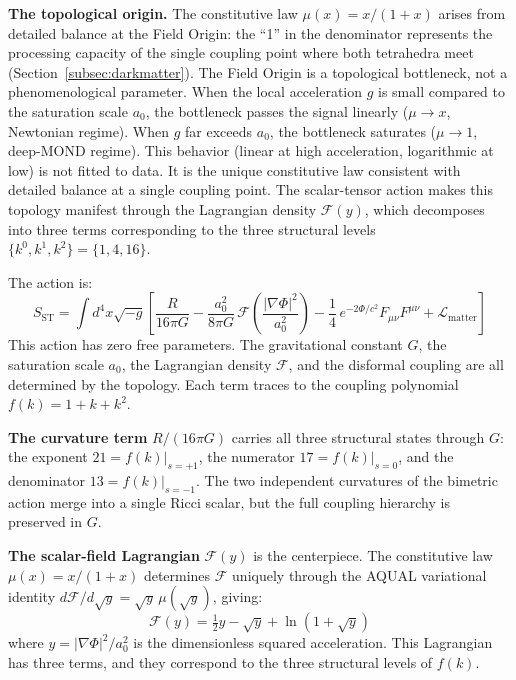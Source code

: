 \documentclass[aps,prd,preprint,superscriptaddress,showpacs,preprintnumbers,amsmath,amssymb,nofootinbib]{revtex4-2}
\begin{document}
\textbf{The topological origin.} The constitutive law $\mu(x) = x/(1+x)$ arises from detailed balance at the Field Origin: the ``1'' in the denominator represents the processing capacity of the single coupling point where both tetrahedra meet (Section~\ref{subsec:darkmatter}). The Field Origin is a topological bottleneck, not a phenomenological parameter. When the local acceleration $g$ is small compared to the saturation scale $a_0$, the bottleneck passes the signal linearly ($\mu \to x$, Newtonian regime). When $g$ far exceeds $a_0$, the bottleneck saturates ($\mu \to 1$, deep-MOND regime). This behavior (linear at high acceleration, logarithmic at low) is not fitted to data. It is the unique constitutive law consistent with detailed balance at a single coupling point. The scalar-tensor action makes this topology manifest through the Lagrangian density $\mathcal{F}(y)$, which decomposes into three terms corresponding to the three structural levels $\{k^0, k^1, k^2\} = \{1, 4, 16\}$.

The action is:
\begin{equation}
S_{\text{ST}} = \int d^4x \sqrt{-g} \left[ \frac{R}{16\pi G} - \frac{a_0^2}{8\pi G}\,\mathcal{F}\!\left(\frac{|\nabla\Phi|^2}{a_0^2}\right) - \frac{1}{4}\,e^{-2\Phi/c^2} F_{\mu\nu}F^{\mu\nu} + \mathcal{L}_{\text{matter}} \right]
\label{eq:scalar-tensor}
\end{equation}
This action has zero free parameters. The gravitational constant $G$, the saturation scale $a_0$, the Lagrangian density $\mathcal{F}$, and the disformal coupling are all determined by the topology. Each term traces to the coupling polynomial $f(k) = 1 + k + k^2$.

\textbf{The curvature term} $R/(16\pi G)$ carries all three structural states through $G$: the exponent $21 = f(k)|_{s=+1}$, the numerator $17 = f(k)|_{s=0}$, and the denominator $13 = f(k)|_{s=-1}$. The two independent curvatures of the bimetric action merge into a single Ricci scalar, but the full coupling hierarchy is preserved in $G$.

\textbf{The scalar-field Lagrangian} $\mathcal{F}(y)$ is the centerpiece. The constitutive law $\mu(x) = x/(1+x)$ determines $\mathcal{F}$ uniquely through the AQUAL variational identity $d\mathcal{F}/d\sqrt{y} = \sqrt{y}\,\mu(\sqrt{y})$, giving:
\begin{equation}
\mathcal{F}(y) = \tfrac{1}{2}y - \sqrt{y} + \ln(1 + \sqrt{y})
\label{eq:aqual-lagrangian}
\end{equation}
where $y = |\nabla\Phi|^2/a_0^2$ is the dimensionless squared acceleration. This Lagrangian has three terms, and they correspond to the three structural levels of $f(k)$.
\end{document}
